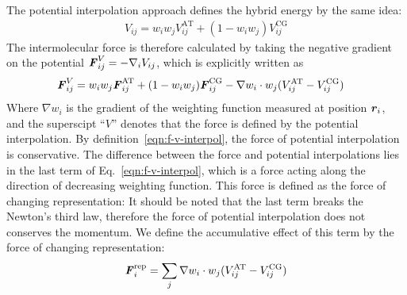 \documentclass[epjST]{svjour}
\newcommand{\vect}[1]{\textbf{\textit{#1}}}
\newcommand{\AT}[0]{\textrm{AT}}
\newcommand{\CG}[0]{\textrm{CG}}
\newcommand{\moleidxone}[0]{i}
\newcommand{\moleidxtwo}[0]{j}
\newcommand{\rep}{{\textrm{rep}}}
\begin{document}
The potential interpolation approach defines the hybrid energy by the same idea:
\begin{align}\label{eqn:v-v-interpol}
  {V}_{\moleidxone \moleidxtwo}=w_\moleidxone w_\moleidxtwo{V}_{\moleidxone\moleidxtwo}^{\AT}+(1-w_\moleidxone w_\moleidxtwo){V}^{\CG}_{\moleidxone\moleidxtwo} 
\end{align}
The intermolecular force is therefore calculated by taking the negative gradient on the potential ${\vect F}^V_{\moleidxone \moleidxtwo}= -\nabla_{\moleidxone}{V}_{\moleidxone \moleidxtwo}$,
which is explicitly written as
\begin{align}\label{eqn:f-v-interpol}
  {\vect F}^V_{\moleidxone \moleidxtwo}
  &=w_\moleidxone w_\moleidxtwo{\vect F}_{\moleidxone\moleidxtwo}^{\AT}+(1-w_\moleidxone w_\moleidxtwo){\vect F}^{\CG}_{\moleidxone\moleidxtwo}  - \nabla w_\moleidxone\cdot w_\moleidxtwo (V^\AT_{\moleidxone \moleidxtwo} - V^\CG_{\moleidxone \moleidxtwo})
\end{align}
Where $\nabla w_\moleidxone$ is the gradient of the weighting function measured at position $\vect r_\moleidxone$,
and the superscipt ``$V$'' denotes that the force is defined
by the potential interpolation.
By  definition~\eqref{eqn:f-v-interpol}, the force of potential interpolation is conservative. 
The difference between the force and potential
interpolations lies in the last term  of Eq.~\eqref{eqn:f-v-interpol}, which is a force
acting along the direction of decreasing weighting function.
This force is defined as the force of changing representation:
It should be noted that
the last term breaks the Newton's third law, therefore the force of potential interpolation
does not conserves the momentum.
We define the accumulative effect of this term by the force of changing representation:
\begin{align}
  \vect F_\moleidxone^\rep = \sum_{\moleidxtwo}  \nabla w_\moleidxone\cdot w_\moleidxtwo (V^\AT_{\moleidxone \moleidxtwo} - V^\CG_{\moleidxone \moleidxtwo})
\end{align}
\end{document}

